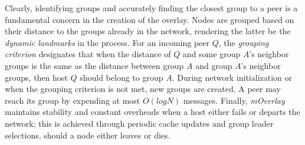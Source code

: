 Clearly, identifying groups and accurately finding the closest group 
to a peer is a fundamental concern in the creation of the overlay.
Nodes are grouped based on their distance to 
the groups already in the network, rendering
the latter be the \emph{dynamic landmarks} in the process. 
For an incoming peer $Q$, 
the \emph{grouping criterion} designates that when the distance of $Q$ and
some group $A$'s neighbor groups is the same as the distance
between group $A$ and group $A$'s neighbor groups, then host $Q$
should belong to group $A$. 
During network initialization or when the grouping
criterion is not met, new groups are created.
A peer may reach its group by expending at most $O(logN)$ messages.
Finally, \emph{mOverlay} maintains stability and constant 
overheads when a host either fails or departs the network;
this is achieved through periodic cache updates and group 
leader selections, should a node either leaves or dies.
%
%
